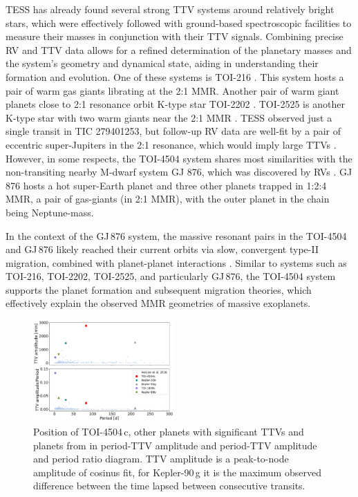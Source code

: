 \documentclass[twocolumn,twocolappendix]{aastex631}
\begin{document}
TESS has already found several strong TTV systems around relatively bright stars, which were effectively followed with ground-based spectroscopic facilities to measure their masses in conjunction with their TTV signals. 
Combining precise RV and TTV data allows for a refined determination of the planetary masses and the system's geometry and dynamical state, aiding in understanding their formation and evolution.
One of these systems is TOI-216 \citep{TOI-216-1, TOI-216-2}. This system hosts a pair of warm gas giants librating at the 2:1 MMR. Another pair of warm giant planets close to 2:1 resonance orbit K-type star TOI-2202 \citep{TOI-2202}. TOI-2525 is another K-type star with two warm giants near the 2:1 MMR \citep{TOI-2525}. TESS observed just a single transit in TIC 279401253, but follow-up RV data are well-fit by a pair of eccentric super-Jupiters in the 2:1 resonance, which would imply large TTVs \citep{Bozhilov2023}.
However, in some respects, the TOI-4504 system shares most similarities with the non-transiting nearby M-dwarf system GJ 876, which was discovered by RVs \citep{GJ876_2,GJ876_1}. GJ 876 hosts a hot super-Earth planet and three other planets trapped in 1:2:4 MMR, a pair of gas-giants (in 2:1 MMR), with the outer planet in the chain being Neptune-mass.

In the context of the GJ\,876 system, the massive resonant pairs in the TOI-4504 and GJ\,876 likely reached their current orbits via slow, convergent type-II migration, combined with planet-planet interactions \citep[see, e.g.,][]{Lee2002, Kley2012}. Similar to systems such as TOI-216, TOI-2202, TOI-2525, and particularly GJ\,876, the TOI-4504 system supports the planet formation and subsequent migration theories, which effectively explain the observed MMR geometries of massive exoplanets.

\begin{figure}[ht!]
  \centering
\includegraphics[width=0.48\textwidth]{holczer.pdf}
  \caption{Position of TOI-4504\,c, other planets with significant TTVs and planets from \cite{Holczer2016} in period-TTV amplitude and period-TTV amplitude and period ratio diagram. TTV amplitude is a peak-to-node amplitude of cosinus fit, for Kepler-90\,g it is the maximum observed difference between the time lapsed between consecutive transits.}
  \label{holczer}
\end{figure}
\end{document}

